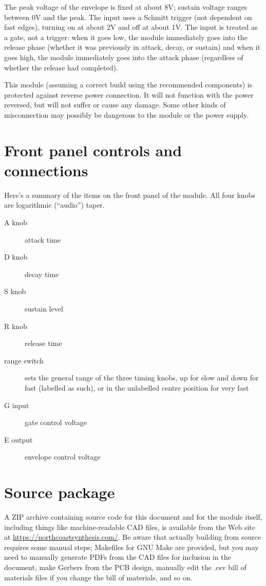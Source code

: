 The peak voltage of the envelope is fixed at about 8V; sustain voltage
ranges between 0V and the peak.  The input uses a Schmitt trigger (not
dependent on fast edges), turning on at about 2V and off at about 1V.  The
input is treated as a gate, not a trigger:  when it goes low, the module
immediately goes into the release phase (whether it was previously in
attack, decay, or sustain) and when it goes high, the module
immediately goes into the attack phase (regardless of whether the release
had completed).

This module (assuming a correct build using the recommended components) is
protected against reverse power connection.  It will not function with the
power reversed, but will not suffer or cause any damage.  Some other kinds
of misconnection may possibly be dangerous to the module or the power
supply.

\section{Front panel controls and connections}

Here's a summary of the items on the front panel of the module.  All four
knobs are logarithmic (``audio'') taper.

\begin{description}
  \item[A knob] attack time

  \item[D knob] decay time

  \item[S knob] sustain level

  \item[R knob] release time
  
  \item[range switch] sets the general range of the three timing knobs, up
    for slow and down for fast (labelled as such), or in the unlabelled centre
    position for very fast

  \item[G input] gate control voltage
  
  \item[E output] envelope control voltage
\end{description}

\section{Source package}

A ZIP archive containing source code for this document and for the module
itself, including things like machine-readable CAD files, is available from 
the Web site at 
\url{https://northcoastsynthesis.com/}.  Be aware that actually building
from source requires some manual steps; Makefiles for GNU Make are provided,
but you may need to manually generate PDFs from the CAD files for inclusion
in the document, make Gerbers from the PCB design, manually edit the .csv
bill of materials files if you change the bill of materials, and so on.

